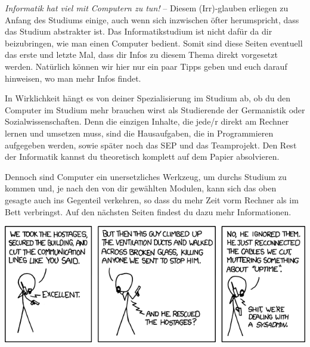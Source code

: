 \begin{multicols}{2}
\emph{Informatik hat viel mit Computern zu tun!} -- Diesem (Irr)-glauben erliegen zu Anfang des Studiums einige, auch wenn sich inzwischen öfter herumspricht, dass das Studium abstrakter ist. Das Informatikstudium ist nicht dafür da dir beizubringen, wie man einen Computer bedient. Somit sind diese Seiten eventuell das erste und letzte Mal,  dass dir Infos zu diesem Thema direkt vorgesetzt werden. Natürlich können wir hier nur ein paar Tipps geben und euch darauf hinweisen, wo man mehr Infos  findet.

In Wirklichkeit hängt es von deiner Spezialisierung im Studium ab, ob  du den Computer im Studium mehr brauchen wirst als  Studierende der Germanistik oder Sozialwissenschaften. Denn die einzigen Inhalte,  die jede/r direkt am Rechner lernen und umsetzen muss, sind die Hausaufgaben,  die in Programmieren aufgegeben werden, sowie später noch das SEP und das Teamprojekt. Den Rest der Informatik kannst du theoretisch komplett auf dem Papier absolvieren.

Dennoch sind Computer ein unersetzliches Werkzeug, um durchs Studium zu kommen und, je nach den von dir gewählten Modulen, kann sich das oben gesagte auch ins Gegenteil verkehren, so dass du mehr Zeit vorm Rechner als im Bett verbringst. Auf den nächsten Seiten findest du dazu mehr Informationen.






\end{multicols}

\vspace{4cm}
\begin{center}
		\includegraphics[totalheight=6cm]{bilder/XKCD/devotion_to_duty}
\end{center}
